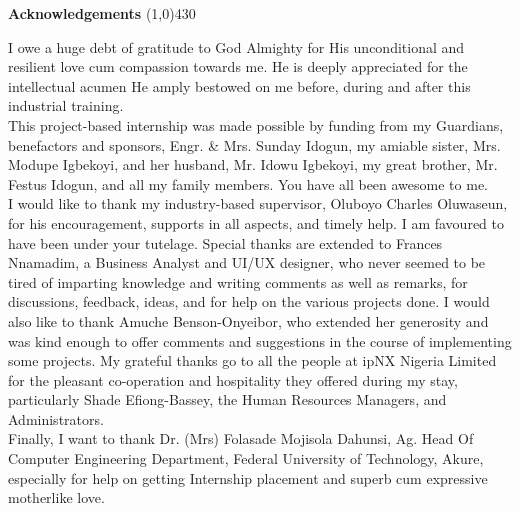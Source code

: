 \begin{center}
{\huge \bf Acknowledgements}
\line(1,0){430}
\end{center}



I owe a huge debt of gratitude to God Almighty for His unconditional and resilient love cum compassion towards me. He is deeply appreciated for the intellectual acumen He amply bestowed on me before, during and after this industrial training.\\

This project-based internship was made possible by funding from my Guardians, benefactors and sponsors, Engr. \& Mrs. Sunday Idogun, my amiable sister, Mrs. Modupe Igbekoyi, and her husband, Mr. Idowu Igbekoyi, my great brother, Mr. Festus Idogun, and all my family members. You have all been awesome to me.\\

I would like to thank my industry-based supervisor, Oluboyo Charles Oluwaseun, for his encouragement, supports in all aspects, and timely help. I am favoured to have been under your tutelage. Special thanks are extended to Frances Nnamadim, a Business Analyst and UI/UX designer, who never seemed to be tired of imparting knowledge and writing comments as well as remarks, for discussions, feedback, ideas, and for help on the various projects done. I would also like to thank Amuche Benson-Onyeibor, who extended her generosity and was kind enough to offer
comments and suggestions in the course of implementing some projects. My grateful thanks go to all the people at ipNX Nigeria Limited for the pleasant co-operation and hospitality they offered during my stay, particularly Shade Efiong-Bassey, the Human Resources Managers, and Administrators.\\

Finally, I want to thank Dr. (Mrs) Folasade Mojisola Dahunsi,  Ag. Head Of Computer Engineering Department, Federal University of Technology, Akure, especially for help on getting Internship placement and superb cum expressive motherlike love.

\clearpage